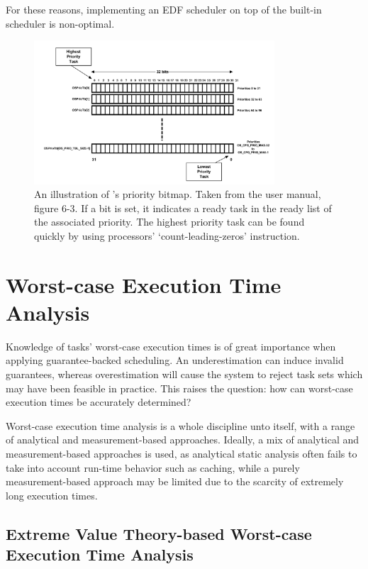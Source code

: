 For these reasons, implementing an EDF scheduler on top of the built-in scheduler is non-optimal.

\begin{figure}[ht]
    \centering
    \includegraphics[width=0.8\textwidth]{figures/priobitmap.png}
    \caption{An illustration of \ucosiii's priority bitmap. Taken from the user manual, figure 6-3. If a bit is set, it indicates a ready task in the ready list of the associated priority. The highest priority task can be found quickly by using processors' `count-leading-zeros' instruction.}
    \label{fig:priobitmap}
\end{figure}


\section{Worst-case Execution Time Analysis}
Knowledge of tasks' worst-case execution times is of great importance when applying guarantee-backed scheduling. An underestimation can induce invalid guarantees, whereas overestimation will cause the system to reject task sets which may have been feasible in practice. This raises the question: how can worst-case execution times be accurately determined?

Worst-case execution time analysis is a whole discipline unto itself, with a range of analytical and measurement-based approaches. Ideally, a mix of analytical and measurement-based approaches is used, as analytical static analysis often fails to take into account run-time behavior such as caching, while a purely measurement-based approach may be limited due to the scarcity of extremely long execution times.

\subsection{Extreme Value Theory-based Worst-case Execution Time Analysis}

